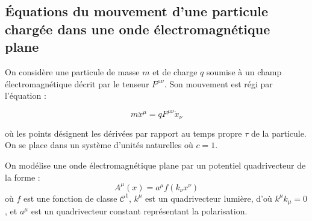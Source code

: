\documentclass[a4paper,10pt]{report}
\begin{document}
\subsection{Équations du mouvement d'une particule chargée dans une onde électromagnétique plane}

On considère une particule de masse $m$ et de charge $q$ soumise à un champ électromagnétique décrit par le tenseur $F^{\mu\nu}$. Son mouvement est régi par l'équation :

\[
m \ddot{x}^\mu = q F^{\mu\nu} \dot{x}_\nu
\]

où les points désignent les dérivées par rapport au temps propre $\tau$ de la particule. On se place dans un système d'unités naturelles où $c = 1$.

On modélise une onde électromagnétique plane par un potentiel quadrivecteur de la forme :
\[
A^\mu(x) = a^\mu f(k_\nu x^\nu)
\]
où $f$ est une fonction de classe $\mathcal{C}^1$, $k^\mu$ est un quadrivecteur lumière, d'où $k^\mu k_\mu = 0$, et $a^\mu$ est un quadrivecteur constant représentant la polarisation.
\end{document}
